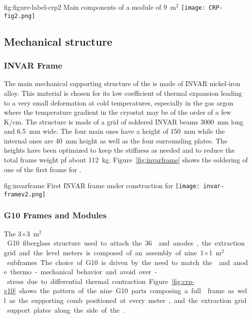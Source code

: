 \begin{dunefigure}{fig:figure-label-crp2}
{Main components of a  module of  \SI{9}{m$^{2}$}}
\texttt{[image: CRP-fig2.png]}
\end{dunefigure}

\subsection{Mechanical structure}
\label{sec:fddp-crp-mechanics}
\subsubsection{INVAR Frame}

The main mechanical supporting structure of the  is made of INVAR nickel-iron alloy. This material is chosen for its low coefficient of thermal expansion leading to a very small deformation at cold temperatures, especially in the gas argon where the temperature gradient in the cryostat may be of the order of a few \si{K/cm}.
The structure is made of a grid of soldered INVAR beams \SI{3000}{mm} long and \SI{6.5}{mm} wide. The four main ones have a height of \SI{150}{mm} while the internal ones are \SI{40}{mm} height as well as the four surrounding plates. The heights have been optimized to keep the stiffness as needed and to reduce the total frame weight pf %
 about \SI{112}{kg}.
Figure~\ref{fig:invarframe} shows the soldering of one of the first  frame for .

\begin{dunefigure}{fig:invarframe}
{First  INVAR frame under construction for }
\texttt{[image: invar-framev2.png]}
\end{dunefigure}

\subsubsection{G10 Frames and Modules}

The \num{3}$\times$\SI{3}{m$^{2}$}  G10 fiberglass structure used to attach the \num{36}  and anodes, the extraction grid and the level meters is composed of an assembly of nine \num{1}$\times$\SI{1}{m$^{2}$} subframes. The choice of G10 is driven by the need to match the  and anode thermo-mechanical behavior and avoid over-stress due to differential thermal contraction. 
Figure~\ref{fig:crp-g10} shows the pattern of the nine G10 parts composing a full  frame as well as the supporting comb positioned at every meter, and the extraction grid support plates along the side of the .

